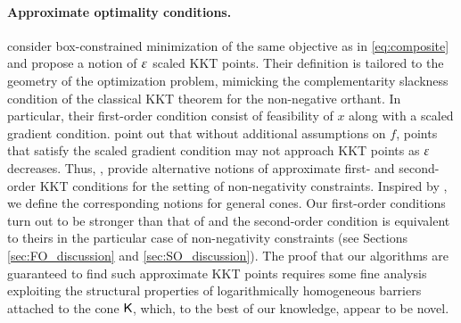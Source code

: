 \paragraph{Approximate optimality conditions.}
\cite{BiaCheYe15} consider box-constrained minimization of the same objective as in \eqref{eq:composite} and propose a notion of $\varepsilon$ scaled KKT points. 
Their definition is tailored to the geometry of the optimization problem, mimicking the complementarity slackness condition of the classical KKT theorem for the non-negative orthant. 
In particular, their first-order condition consist of feasibility of $x$ along with a scaled gradient condition.
\cite{HaeLiuYe18,NeiWr20} point out that without additional assumptions on $f$, points that satisfy the scaled gradient condition may not approach KKT points as $\varepsilon$ decreases. 
Thus, \cite{HaeLiuYe18,NeiWr20}, provide alternative notions of approximate first- and second-order KKT conditions for the setting of non-negativity constraints. 
Inspired by \cite{HaeLiuYe18}, we define the corresponding notions for general cones. Our first-order conditions turn out to be stronger than that of  \cite{HaeLiuYe18,NeiWr20} and the second-order condition is equivalent to theirs in the particular case of non-negativity constraints (see Sections \ref{sec:FO_discussion} and \ref{sec:SO_discussion}). The proof that our algorithms are guaranteed to find such approximate KKT points requires some fine analysis exploiting the structural properties of logarithmically homogeneous barriers attached to the cone $\mathsf{K}$, which, to the best of our knowledge, appear to be novel. 
 

